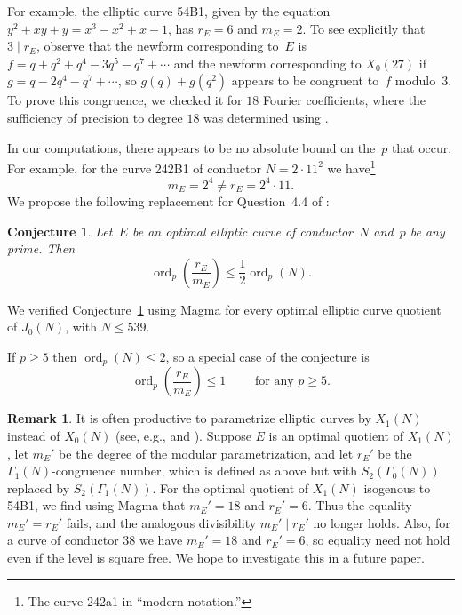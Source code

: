 \documentclass[10pt,twoside]{article}
\newcommand{\re}{r_{\scriptscriptstyle E}}
\newcommand{\me}{m_{\scriptscriptstyle E}}
\newcommand{\ce}{c_{\scriptscriptstyle{E}}}
\newtheorem{conj}[lem]{Conjecture}
\theoremstyle{definition}
\newtheorem{rmk}[lem]{Remark}
\DeclareMathOperator{\ord}{ord}
\begin{document}
For example, the elliptic curve 54B1, given by the equation $y^2 + xy +
y = x^3 - x^2 + x - 1$, has $\re=6$ and $\me=2$.  To see explicitly
that $3 \mid \re$, observe that the newform corresponding to~$E$ is
$f=q + q^2 + q^4 - 3q^5 - q^7 + \cdots$ and the newform corresponding
to $X_0(27)$ if $g=q - 2q^4 - q^7 + \cdots$, so $g(q) + g(q^2)$
appears to be congruent to~$f$ modulo~$3$.  To prove this congruence,
we checked it for $18$ Fourier coefficients, where the 
sufficiency of precision to degree $18$
was determined using \cite{sturm:cong}.


In our computations, there appears to be no absolute bound on the~$p$
that occur.  For example, for the curve 242B1 of conductor $N=2\cdot 11^2$
we have\footnote{The curve 242a1 in ``modern notation.''}
$$
\me = 2^4 \neq \re = 2^4\cdot 11.
$$
We propose the following replacement for Question~4.4 of
\cite{frey-muller}:
\begin{conj}\label{conj:rm}
  Let~$E$ be an optimal elliptic curve of conductor~$N$ 
  and~$p$ be any prime. 
  Then
$$
\ord_p\left(\frac{\re}{\me}\right) \leq \frac{1}{2}\ord_p(N). 
$$
\end{conj}
We verified Conjecture~\ref{conj:rm} using Magma for every optimal
elliptic curve quotient of $J_0(N)$, with $N\leq 539$.

If $p\geq 5$ then $\ord_p(N)\leq 2$, so a special case
of the conjecture is 
$$
  \ord_p\left(\frac{\re}{\me}\right) \leq 1\qquad\text{ for any }p\geq 5.
$$


\begin{rmk}
  It is often productive to parametrize elliptic curves by $X_1(N)$
  instead of $X_0(N)$ (see, e.g., \cite{stevens:param} and
  \cite{MR2135139}).  Suppose $E$ is an optimal quotient of $X_1(N)$,
  let $m_E'$ be the degree of the modular parametrization, and let
  $r_E'$ be the $\Gamma_1(N)$-congruence number, which is defined as
  above but with $S_2(\Gamma_0(N))$ replaced by $S_2(\Gamma_1(N))$.
  For the optimal quotient of $X_1(N)$ isogenous to 54B1, we find
  using Magma that $m_E' = 18$ and $r_E'=6$. Thus the equality
  $m_E'=r_E'$ fails, and the analogous divisibility $m_E'\mid
  r_E'$ no longer holds.  Also, for a curve of conductor $38$ we have
  $m_E'=18$ and $r_E'=6$, so equality need not hold even if the level
  is square free.  We hope to investigate this in a future paper.
%
\end{rmk}
\end{document}
